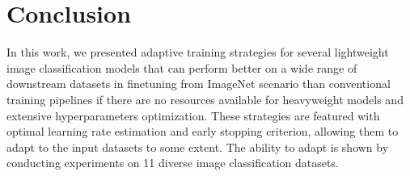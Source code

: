 \documentclass[runningheads]{llncs}
\begin{document}
\section{Conclusion}
In this work, we presented adaptive training strategies for several lightweight image classification models that
can perform better on a wide range of downstream datasets in finetuning from ImageNet scenario
than conventional training pipelines if there are no resources available for heavyweight models and extensive hyperparameters optimization.
These strategies are featured with optimal learning rate estimation and early stopping criterion, allowing
them to adapt to the input datasets to some extent. The ability to adapt is shown by conducting experiments on 11 diverse image classification datasets.
%
%
%



\end{document}
